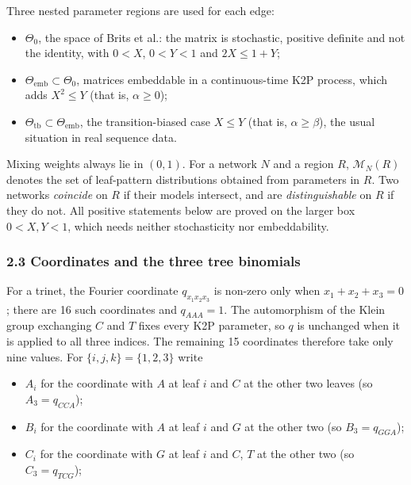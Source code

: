 \documentclass[
  11pt,
]{article}
\providecommand{\tightlist}{%
  \setlength{\itemsep}{0pt}\setlength{\parskip}{0pt}}
\begin{document}
Three nested parameter regions are used for each edge:

\begin{itemize}
\tightlist
\item
  \(\Theta_0\), the space of Brits et al.: the matrix is stochastic,
  positive definite and not the identity, with \(0<X\), \(0<Y<1\) and
  \(2X \le 1+Y\);
\item
  \(\Theta_{\mathrm{emb}} \subset \Theta_0\), matrices embeddable in a
  continuous-time K2P process, which adds \(X^2 \le Y\) (that is,
  \(\alpha \ge 0\));
\item
  \(\Theta_{\mathrm{tb}} \subset \Theta_{\mathrm{emb}}\), the
  transition-biased case \(X \le Y\) (that is, \(\alpha \ge \beta\)),
  the usual situation in real sequence data.
\end{itemize}

Mixing weights always lie in \((0,1)\). For a network \(N\) and a region
\(R\), \(\mathcal M_N(R)\) denotes the set of leaf-pattern distributions
obtained from parameters in \(R\). Two networks \emph{coincide} on \(R\)
if their models intersect, and are \emph{distinguishable} on \(R\) if
they do not. All positive statements below are proved on the larger box
\(0<X,Y<1\), which needs neither stochasticity nor embeddability.

\subsubsection{2.3 Coordinates and the three tree
binomials}\label{coordinates-and-the-three-tree-binomials}

For a trinet, the Fourier coordinate \(q_{x_1x_2x_3}\) is non-zero only
when \(x_1+x_2+x_3=0\); there are 16 such coordinates and \(q_{AAA}=1\).
The automorphism of the Klein group exchanging \(C\) and \(T\) fixes
every K2P parameter, so \(q\) is unchanged when it is applied to all
three indices. The remaining 15 coordinates therefore take only nine
values. For \(\{i,j,k\}=\{1,2,3\}\) write

\begin{itemize}
\tightlist
\item
  \(A_i\) for the coordinate with \(A\) at leaf \(i\) and \(C\) at the
  other two leaves (so \(A_3 = q_{CCA}\));
\item
  \(B_i\) for the coordinate with \(A\) at leaf \(i\) and \(G\) at the
  other two (so \(B_3 = q_{GGA}\));
\item
  \(C_i\) for the coordinate with \(G\) at leaf \(i\) and \(C\), \(T\)
  at the other two (so \(C_3 = q_{TCG}\));
\end{itemize}
\end{document}
